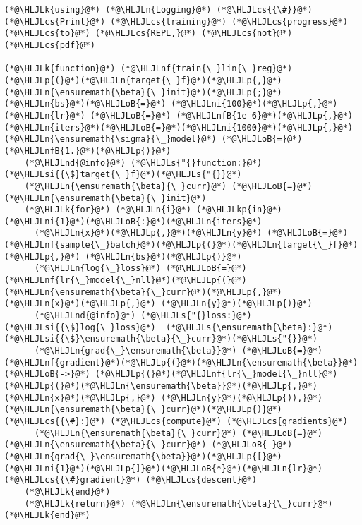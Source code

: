 \documentclass[12pt,a4paper]{article}
\newcommand{\HLJLk}[1]{\textcolor[RGB]{148,91,176}{\textbf{#1}}}
\newcommand{\HLJLkp}[1]{\textcolor[RGB]{148,91,176}{\textbf{#1}}}
\newcommand{\HLJLn}[1]{#1}
\newcommand{\HLJLnd}[1]{\textcolor[RGB]{214,102,97}{#1}}
\newcommand{\HLJLnf}[1]{\textcolor[RGB]{66,102,213}{#1}}
\newcommand{\HLJLs}[1]{\textcolor[RGB]{201,61,57}{#1}}
\newcommand{\HLJLsi}[1]{#1}
\newcommand{\HLJLnfB}[1]{\textcolor[RGB]{59,151,46}{#1}}
\newcommand{\HLJLni}[1]{\textcolor[RGB]{59,151,46}{#1}}
\newcommand{\HLJLoB}[1]{\textcolor[RGB]{102,102,102}{\textbf{#1}}}
\newcommand{\HLJLp}[1]{#1}
\newcommand{\HLJLcs}[1]{\textcolor[RGB]{153,153,119}{\textit{#1}}}
\begin{document}
\begin{lstlisting}
(*@\HLJLk{using}@*) (*@\HLJLn{Logging}@*) (*@\HLJLcs{{\#}}@*) (*@\HLJLcs{Print}@*) (*@\HLJLcs{training}@*) (*@\HLJLcs{progress}@*) (*@\HLJLcs{to}@*) (*@\HLJLcs{REPL,}@*) (*@\HLJLcs{not}@*) (*@\HLJLcs{pdf}@*)

(*@\HLJLk{function}@*) (*@\HLJLnf{train{\_}lin{\_}reg}@*)(*@\HLJLp{(}@*)(*@\HLJLn{target{\_}f}@*)(*@\HLJLp{,}@*) (*@\HLJLn{\ensuremath{\beta}{\_}init}@*)(*@\HLJLp{;}@*) (*@\HLJLn{bs}@*)(*@\HLJLoB{=}@*) (*@\HLJLni{100}@*)(*@\HLJLp{,}@*) (*@\HLJLn{lr}@*) (*@\HLJLoB{=}@*) (*@\HLJLnfB{1e-6}@*)(*@\HLJLp{,}@*) (*@\HLJLn{iters}@*)(*@\HLJLoB{=}@*)(*@\HLJLni{1000}@*)(*@\HLJLp{,}@*) (*@\HLJLn{\ensuremath{\sigma}{\_}model}@*) (*@\HLJLoB{=}@*) (*@\HLJLnfB{1.}@*)(*@\HLJLp{)}@*)
    (*@\HLJLnd{@info}@*) (*@\HLJLs{"{}function:}@*) (*@\HLJLsi{{\$}target{\_}f}@*)(*@\HLJLs{"{}}@*)
    (*@\HLJLn{\ensuremath{\beta}{\_}curr}@*) (*@\HLJLoB{=}@*) (*@\HLJLn{\ensuremath{\beta}{\_}init}@*)
    (*@\HLJLk{for}@*) (*@\HLJLn{i}@*) (*@\HLJLkp{in}@*) (*@\HLJLni{1}@*)(*@\HLJLoB{:}@*)(*@\HLJLn{iters}@*)
      (*@\HLJLn{x}@*)(*@\HLJLp{,}@*)(*@\HLJLn{y}@*) (*@\HLJLoB{=}@*) (*@\HLJLnf{sample{\_}batch}@*)(*@\HLJLp{(}@*)(*@\HLJLn{target{\_}f}@*)(*@\HLJLp{,}@*) (*@\HLJLn{bs}@*)(*@\HLJLp{)}@*)
      (*@\HLJLn{log{\_}loss}@*) (*@\HLJLoB{=}@*) (*@\HLJLnf{lr{\_}model{\_}nll}@*)(*@\HLJLp{(}@*)(*@\HLJLn{\ensuremath{\beta}{\_}curr}@*)(*@\HLJLp{,}@*) (*@\HLJLn{x}@*)(*@\HLJLp{,}@*) (*@\HLJLn{y}@*)(*@\HLJLp{)}@*)
      (*@\HLJLnd{@info}@*) (*@\HLJLs{"{}loss:}@*) (*@\HLJLsi{{\$}log{\_}loss}@*)  (*@\HLJLs{\ensuremath{\beta}:}@*) (*@\HLJLsi{{\$}\ensuremath{\beta}{\_}curr}@*)(*@\HLJLs{"{}}@*)
      (*@\HLJLn{grad{\_}\ensuremath{\beta}}@*) (*@\HLJLoB{=}@*) (*@\HLJLnf{gradient}@*)(*@\HLJLp{(}@*)(*@\HLJLn{\ensuremath{\beta}}@*) (*@\HLJLoB{->}@*) (*@\HLJLp{(}@*)(*@\HLJLnf{lr{\_}model{\_}nll}@*)(*@\HLJLp{(}@*)(*@\HLJLn{\ensuremath{\beta}}@*)(*@\HLJLp{,}@*) (*@\HLJLn{x}@*)(*@\HLJLp{,}@*) (*@\HLJLn{y}@*)(*@\HLJLp{)),}@*)(*@\HLJLn{\ensuremath{\beta}{\_}curr}@*)(*@\HLJLp{)}@*)(*@\HLJLcs{{\#}:}@*) (*@\HLJLcs{compute}@*) (*@\HLJLcs{gradients}@*)
      (*@\HLJLn{\ensuremath{\beta}{\_}curr}@*) (*@\HLJLoB{=}@*) (*@\HLJLn{\ensuremath{\beta}{\_}curr}@*) (*@\HLJLoB{-}@*) (*@\HLJLn{grad{\_}\ensuremath{\beta}}@*)(*@\HLJLp{[}@*)(*@\HLJLni{1}@*)(*@\HLJLp{]}@*)(*@\HLJLoB{*}@*)(*@\HLJLn{lr}@*) (*@\HLJLcs{{\#}gradient}@*) (*@\HLJLcs{descent}@*)
    (*@\HLJLk{end}@*)
    (*@\HLJLk{return}@*) (*@\HLJLn{\ensuremath{\beta}{\_}curr}@*)
(*@\HLJLk{end}@*)
\end{lstlisting}
\end{document}
